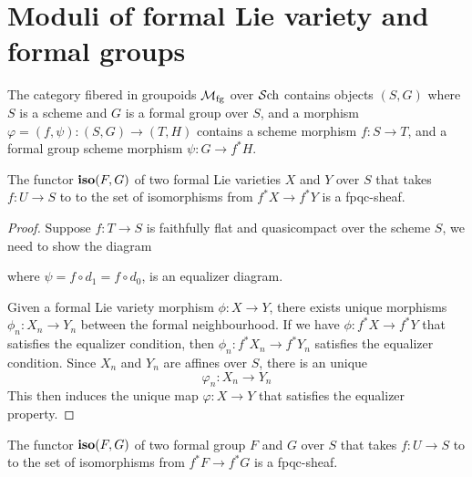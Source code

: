 \section{Moduli of formal Lie variety and formal groups}\label{sec:formalgroups-moduliformalgroup}
\begin{definition}
    The category fibered in groupoids $\mathcal{M}_{\mathrm{fg}}$ over $\mathcal{S}\mathrm{ch}$ contains objects $(S, G)$ where $S$ is a scheme and $G$ is a formal group over $S$, and a morphism $\varphi=(f, \psi): (S, G)\to (T, H)$ contains a scheme morphism $f: S\to T$, and a formal group scheme morphism $\psi: G\to f^*H$.
\end{definition}


\begin{lemma}
    The functor $\operatorname{\mathbf{iso}}(F,G)$ of two formal Lie varieties $X$ and $Y$ over $S$ that takes $f:U\to S$ to to the set of isomorphisms from $f^*X\to f^*Y$ is a fpqc-sheaf.
\end{lemma}
\begin{proof}
    Suppose $f:T\to S$ is faithfully flat and quasicompact over the scheme $S$, we need to show the diagram
    \begin{center}
    \end{center}where $\psi=f\circ d_1=f\circ d_0$, is an equalizer diagram.

    Given a formal Lie variety morphism $\phi: X\to Y$, there exists unique morphisms $\phi_n: X_n\to Y_n$ between the formal neighbourhood. If we have $\phi: f^*X\to f^*Y$ that satisfies the equalizer condition, then $\phi_n: f^*X_n\to f^*Y_n$ satisfies the equalizer condition. Since $X_n$ and $Y_n$ are affines over $S$, there is an unique
    \[
    \varphi_n: X_n\to Y_n
    \]This then induces the unique map $\varphi: X\to Y$ that satisfies the equalizer property.
\end{proof}

\begin{corollary}
The functor $\operatorname{\mathbf{iso}}(F,G)$ of two formal group $F$ and $G$ over $S$ that takes $f:U\to S$ to to the set of isomorphisms from $f^*F\to f^*G$ is a fpqc-sheaf.
\end{corollary}

